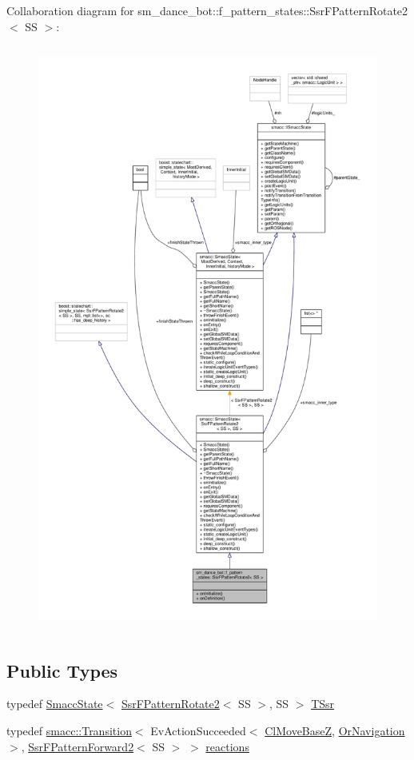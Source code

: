 Collaboration diagram for sm\+\_\+dance\+\_\+bot\+:\+:f\+\_\+pattern\+\_\+states\+:\+:Ssr\+F\+Pattern\+Rotate2$<$ SS $>$\+:\nopagebreak
\begin{figure}[H]
\begin{center}
\leavevmode
\includegraphics[height=550pt]{structsm__dance__bot_1_1f__pattern__states_1_1SsrFPatternRotate2__coll__graph}
\end{center}
\end{figure}
\subsection*{Public Types}
\begin{DoxyCompactItemize}
\item 
typedef \hyperlink{classSmaccState}{Smacc\+State}$<$ \hyperlink{structsm__dance__bot_1_1f__pattern__states_1_1SsrFPatternRotate2}{Ssr\+F\+Pattern\+Rotate2}$<$ SS $>$, SS $>$ \hyperlink{structsm__dance__bot_1_1f__pattern__states_1_1SsrFPatternRotate2_a88a56b5e255ad57b622ffc4f8c412fa0}{T\+Ssr}
\item 
typedef \hyperlink{classsmacc_1_1Transition}{smacc\+::\+Transition}$<$ Ev\+Action\+Succeeded$<$ \hyperlink{classmove__base__z__client_1_1ClMoveBaseZ}{Cl\+Move\+BaseZ}, \hyperlink{classsm__dance__bot_1_1OrNavigation}{Or\+Navigation} $>$, \hyperlink{structsm__dance__bot_1_1f__pattern__states_1_1SsrFPatternForward2}{Ssr\+F\+Pattern\+Forward2}$<$ SS $>$ $>$ \hyperlink{structsm__dance__bot_1_1f__pattern__states_1_1SsrFPatternRotate2_a8a716c85615eeedf305680bb7d3519c0}{reactions}
\end{DoxyCompactItemize}
